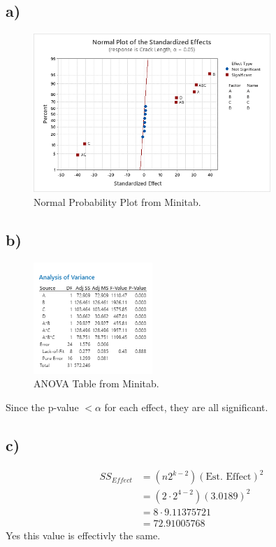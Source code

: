 \documentclass{article}
\begin{document}
\subsection*{a)}
\begin{figure}[h]
    \centering
    \includegraphics[width=0.8\textwidth]{./images/2_a.png}
    \caption{Normal Probability Plot from Minitab.}
    \label{fig:3_b_2}
\end{figure}
\subsection*{b)}
\begin{figure}[h]
    \centering
    \includegraphics[width=0.4\textwidth]{./images/2_b.png}
    \caption{ANOVA Table from Minitab.}
    \label{fig:3_b_2}
\end{figure}
Since the p-value $< \alpha$ for each effect, they are all significant.
\clearpage
\subsection*{c)}
\begin{align*}
    SS_{Effect} &= \left(n2^{k-2}\right)\left(\text{Est. Effect}\right)^2 \\
                &= \left(2 \cdot 2^{4-2}\right)\left(\text{3.0189}\right)^2 \\
                &= 8 \cdot 9.11375721\\
                &= 72.91005768
\end{align*}
Yes this value is effectivly the same.
\end{document}

